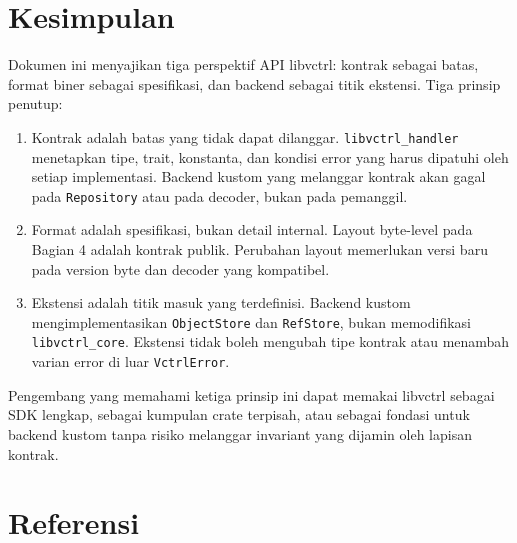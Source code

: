 \documentclass[11pt,a4paper]{article}
\begin{document}
\section{Kesimpulan}

Dokumen ini menyajikan tiga perspektif API libvctrl: kontrak sebagai batas, format biner sebagai spesifikasi, dan backend sebagai titik ekstensi. Tiga prinsip penutup:

\begin{enumerate}
	\item Kontrak adalah batas yang tidak dapat dilanggar. \texttt{libvctrl\_handler} menetapkan tipe, trait, konstanta, dan kondisi error yang harus dipatuhi oleh setiap implementasi. Backend kustom yang melanggar kontrak akan gagal pada \texttt{Repository} atau pada decoder, bukan pada pemanggil.
	\item Format adalah spesifikasi, bukan detail internal. Layout byte-level pada Bagian 4 adalah kontrak publik. Perubahan layout memerlukan versi baru pada version byte dan decoder yang kompatibel.
	\item Ekstensi adalah titik masuk yang terdefinisi. Backend kustom mengimplementasikan \texttt{ObjectStore} dan \texttt{RefStore}, bukan memodifikasi \texttt{libvctrl\_core}. Ekstensi tidak boleh mengubah tipe kontrak atau menambah varian error di luar \texttt{VctrlError}.
\end{enumerate}

Pengembang yang memahami ketiga prinsip ini dapat memakai libvctrl sebagai SDK lengkap, sebagai kumpulan crate terpisah, atau sebagai fondasi untuk backend kustom tanpa risiko melanggar invariant yang dijamin oleh lapisan kontrak.

\newpage
\section*{Referensi}
\end{document}
